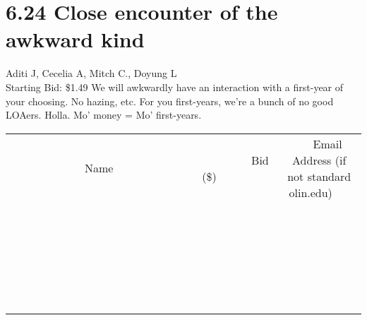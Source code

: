 \documentclass[11pt]{article}
\begin{document}
\section*{6.24 Close encounter of the awkward kind}
Aditi J, Cecelia A, Mitch C., Doyung L
\\
Starting Bid: \$1.49
\newline
We will awkwardly have an interaction with a first-year of your choosing. No hazing, etc. For you first-years, we're a bunch of no good LOAers. Holla. Mo' money = Mo' first-years.
\\[6ex]
\begin{tabular}{c c c}
~~~~~~~~~~~~~Name~~~~~~~~~~~~~ & ~~~~~~~~~Bid (\$)~~~~~~~~~  & ~~~Email Address (if not standard olin.edu)~~~\\
 & & \\
\hline
 & & \\
\hline
 & & \\
\hline
 & & \\
\hline
 & & \\
\hline
 & & \\
\hline
 & & \\
\hline
 & & \\
\hline
 & & \\
\hline
 & & \\
\hline
 & & \\
\hline
 & & \\
\hline
 & & \\
\hline
 & & \\
\hline
 & & \\
\hline
 & & \\
\hline
 & & \\
\hline
 & & \\
\hline
 & & \\
\hline
 & & \\
\hline
 & & \\
\hline
 & & \\
\hline
 & & \\
\hline
 & & \\
\hline
 & & \\
\hline
 & & \\
\hline
\end{tabular}
\newpage
\end{document}
